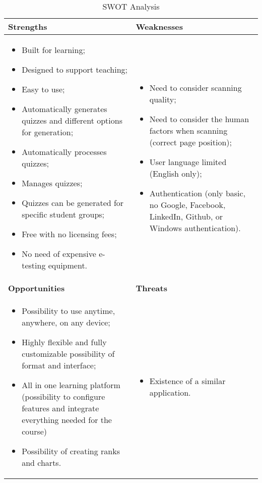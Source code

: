 \begin{table}[ht!]
\centering
\caption{SWOT Analysis}
{
  \begin{tabular}{p{8cm}p{8cm}}
    \bfseries Strengths &\bfseries Weaknesses  \\ \hline 
    {\parbox{0.4\textwidth}{
      \begin{itemize}                    
        \item Built for learning;  
        \item Designed to support teaching; 
        \item Easy to use;  
        \item Automatically generates quizzes and different options for generation;
        \item Automatically processes quizzes;
        \item Manages quizzes;
        \item Quizzes can be generated for specific student groups;
        \item Free with no licensing fees;
        \item No need of expensive e-testing equipment.            
      \end{itemize} }} &
    {\parbox{0.4\textwidth}{
      \begin{itemize}                    
        \item Need to consider scanning quality; 
        \item Need to consider the human factors when scanning (correct page position); 
        \item User language limited (English only);            
        \item Authentication (only basic, no Google, Facebook, LinkedIn, Github, or Windows authentication).
      \end{itemize} }} \\
    \bfseries Opportunities &\bfseries Threats  \\ \hline 
    {\parbox{0.4\textwidth}{
      \begin{itemize}                    
        \item     Possibility to use anytime, anywhere, on any device;
        \item     Highly flexible and fully customizable possibility of format and interface;
        \item     All in one learning platform (possibility to configure features and integrate everything needed for the course)
        \item     Possibility of creating ranks and charts.             
        \end{itemize} }} &
    {\parbox{0.4\textwidth}{
      \begin{itemize}                    
        \item Existence of a similar application.       
      \end{itemize} }}
   \end{tabular}
}
\label{swot_analysis}
\end{table}


